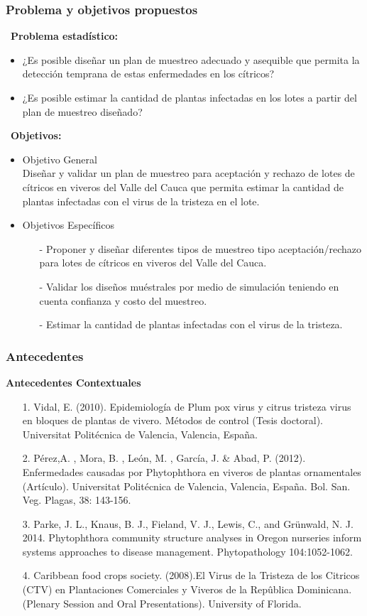 \documentclass[11pt]{beamer}
\begin{document}
\begin{frame}
\frametitle{Problema y objetivos propuestos}
~\textbf{Problema estadístico:}
\begin{itemize}
\justifying
\item ¿Es posible diseñar un plan de muestreo adecuado y asequible que permita la detección temprana de estas enfermedades en los cítricos?
\item ¿Es posible estimar la cantidad de plantas infectadas en los lotes a partir del plan de muestreo diseñado?
\end{itemize}
~\textbf{Objetivos:}
\begin{itemize}
\justifying
\item Objetivo General
~\\Diseñar y validar un plan de muestreo para aceptación y rechazo de lotes de cítricos en viveros del Valle del Cauca que permita estimar la cantidad de plantas infectadas con el virus de la tristeza en el lote.
\item Objetivos Específicos
\begin{itemize}
\item[-]Proponer y diseñar diferentes tipos de muestreo tipo aceptación/rechazo para lotes de cítricos en viveros del Valle del Cauca.
\item[-]Validar los diseños muéstrales por medio de simulación teniendo en cuenta confianza y costo del muestreo.
\item[-]Estimar la cantidad de plantas infectadas con el virus de la tristeza.
\end{itemize}
\end{itemize}
\end{frame}

\begin{frame}
\frametitle{Antecedentes}
\textbf{Antecedentes Contextuales}
\begin{itemize}
\justifying
\item[1.]Vidal, E. (2010). Epidemiología de Plum pox virus y citrus tristeza virus en bloques de plantas de vivero. Métodos de control (Tesis doctoral). Universitat Politécnica de Valencia, Valencia, España.
\item[2.]Pérez,A. , Mora, B. , León, M. , García, J. \& Abad, P. (2012). Enfermedades causadas por Phytophthora en viveros de plantas ornamentales (Artículo). Universitat Politécnica de Valencia, Valencia, España. Bol. San. Veg. Plagas, 38: 143-156.
\item[3.]Parke, J. L., Knaus, B. J., Fieland, V. J., Lewis, C., and Grünwald, N. J.
2014. Phytophthora community structure analyses in Oregon nurseries
inform systems approaches to disease management. Phytopathology
104:1052-1062.
\item[4.]Caribbean food crops society. (2008).El Virus de la Tristeza de los Citricos (CTV) en Plantaciones Comerciales y Viveros
de la Repûblica Dominicana.(Plenary Session and Oral Presentations). University of Florida.
\end{itemize}
\end{frame}
\end{document}
